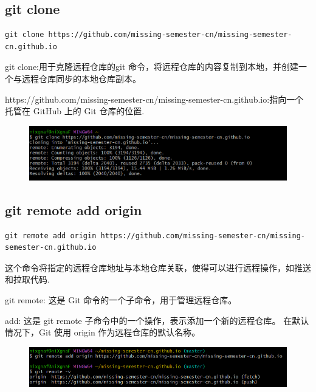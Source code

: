 \documentclass{article}
\begin{document}
\subsection{git clone}

\lstset{language=bash}
\begin{lstlisting}
git clone https://github.com/missing-semester-cn/missing-semester-cn.github.io
\end{lstlisting}

\noindent git clone:用于克隆远程仓库的git 命令，将远程仓库的内容复制到本地，并创建一个与远程仓库同步的本地仓库副本。

\noindent https://github.com/missing-semester-cn/missing-semester-cn.github.io:指向一个托管在 GitHub 上的 Git 仓库的位置.

\begin{figure}[h]
    \centering
    \includegraphics[width=1\linewidth]{picture/gitclone.png}
\end{figure}

\subsection{git remote add origin}
\lstset{language=bash}
\begin{lstlisting}
git remote add origin https://github.com/missing-semester-cn/missing-semester-cn.github.io
\end{lstlisting}

\noindent 这个命令将指定的远程仓库地址与本地仓库关联，使得可以进行远程操作，如推送和拉取代码.

\noindent git remote: 这是 Git 命令的一个子命令，用于管理远程仓库。

\noindent add: 这是 git remote 子命令中的一个操作，表示添加一个新的远程仓库。
在默认情况下，Git 使用 origin 作为远程仓库的默认名称。

\begin{figure}[h]
    \centering
    \includegraphics[width=1\linewidth]{picture/remoteadd.png}
\end{figure}
\end{document}
